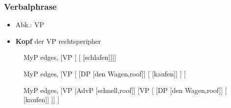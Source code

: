 \begin{frame}
\frametitle{Verbalphrase}

\begin{itemize}
	\item Abk.: VP
	\item \textbf{Kopf} der VP \ras rechtsperipher 
\end{itemize}

\begin{figure}[b]
	\begin{minipage}[b]{0.18\textwidth}
	\centering
	\footnotesize{
		\begin{forest}
		MyP edges,
		[VP [ [ [schlafen]]]]
		\end{forest}
		}
  	\end{minipage}  
  	\pause            
	\begin{minipage}[b]{0.03\textwidth}
	\hfill
  	\end{minipage}
  	\begin{minipage}[b]{0.30\textwidth}
	\centering
	\footnotesize{
		\begin{forest}
		MyP edges,
		[VP [	[DP [den Wagen,roof]]
						[\zerobar{V} [kaufen]]
			]
		]			 
		\end{forest}
		}
  	\end{minipage}  
	\begin{minipage}[b]{0.03\textwidth}
	\hfill
  	\end{minipage}
  	\pause            
	\begin{minipage}[b]{0.41\textwidth}
	\centering
	\footnotesize{
		\begin{forest}
		MyP edges,
		[VP [AdvP [schnell,roof]]
			[VP 
		    [	[DP [den Wagen,roof]]				
		    			[ [kaufen]]
			]]
		]			 
		\end{forest}
		}
  	\end{minipage}
\end{figure}

\end{frame}


